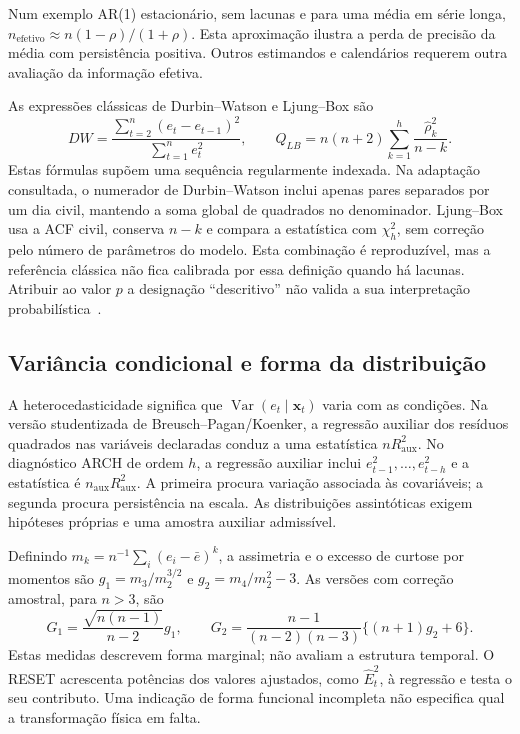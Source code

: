 Num exemplo AR(1) estacionário, sem lacunas e para uma média em série longa, $n_{\mathrm{efetivo}}\approx n(1-\rho)/(1+\rho)$. Esta aproximação ilustra a perda de precisão da média com persistência positiva. Outros estimandos e calendários requerem outra avaliação da informação efetiva.

As expressões clássicas de
Durbin--Watson e
Ljung--Box são
\begin{equation}
DW=\frac{\sum_{t=2}^{n}(e_t-e_{t-1})^2}{\sum_{t=1}^{n}e_t^2},
\qquad Q_{LB}=n(n+2)\sum_{k=1}^{h}\frac{\widehat\rho_k^2}{n-k}.
\label{eq:mat-dw-lb}
\end{equation}
Estas fórmulas supõem uma sequência regularmente indexada. Na adaptação consultada, o numerador de Durbin--Watson inclui apenas pares separados por um dia civil, mantendo a soma global de quadrados no denominador. Ljung--Box usa a ACF civil, conserva $n-k$ e compara a estatística com $\chi^2_h$, sem correção pelo número de parâmetros do modelo. Esta combinação é reproduzível, mas a referência clássica não fica calibrada por essa definição quando há lacunas. Atribuir ao valor $p$ a designação ``descritivo'' não valida a sua interpretação probabilística~\parencite{BoxJenkins2015}.

\subsection{Variância condicional e forma da distribuição}
\label{sec:mat-variancia-forma}
A heterocedasticidade significa que $\operatorname{Var}(e_t\mid\boldsymbol x_t)$ varia com as condições. Na versão studentizada de
Breusch--Pagan/Koenker, a
regressão auxiliar dos resíduos quadrados nas variáveis declaradas conduz a uma estatística $nR_{\mathrm{aux}}^2$. No diagnóstico ARCH de ordem $h$, a regressão auxiliar inclui $e_{t-1}^2,\ldots,e_{t-h}^2$ e a estatística é $n_{\mathrm{aux}}R_{\mathrm{aux}}^2$. A primeira procura variação associada às covariáveis; a segunda procura persistência na escala. As distribuições assintóticas exigem hipóteses próprias e uma amostra auxiliar admissível.

Definindo $m_k=n^{-1}\sum_i(e_i-\bar e)^k$, a assimetria e o excesso de curtose por momentos são $g_1=m_3/m_2^{3/2}$ e $g_2=m_4/m_2^2-3$. As versões com correção amostral, para $n>3$, são
\begin{equation}
G_1=\frac{\sqrt{n(n-1)}}{n-2}g_1,
\qquad
G_2=\frac{n-1}{(n-2)(n-3)}\{(n+1)g_2+6\}.
\label{eq:mat-forma}
\end{equation}
Estas medidas descrevem forma marginal; não avaliam a estrutura temporal. O RESET acrescenta potências dos valores ajustados, como $\widehat E_t^2$, à regressão e testa o seu contributo. Uma indicação de forma funcional incompleta não especifica qual a transformação física em falta.

